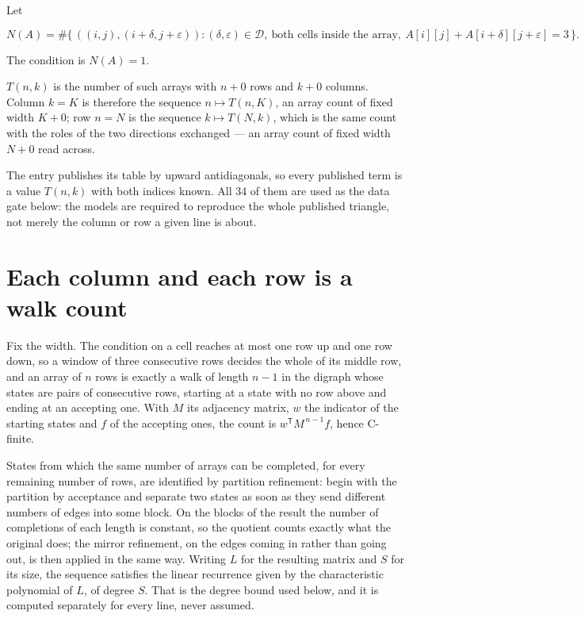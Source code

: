 \documentclass[11pt]{article}
\theoremstyle{definition}
\begin{document}
Let

\[N(A) = \#\bigl\{\,((i,j),(i{+}\delta,j{+}\varepsilon)) : (\delta,\varepsilon) \in \mathcal{D},\ \text{both cells inside the array},\ A[i][j] + A[i{+}\delta][j{+}\varepsilon] = 3\,\bigr\}.\]

The condition is $N(A) = 1$.

$T(n,k)$ is the number of such arrays with $n + 0$ rows and $k + 0$ columns. Column $k = K$ is therefore the sequence $n \mapsto T(n,K)$, an array count of fixed width $K + 0$; row $n = N$ is the sequence $k \mapsto T(N,k)$, which is the same count with the roles of the two directions exchanged --- an array count of fixed width $N + 0$ read across.

The entry publishes its table by upward antidiagonals, so every published term is a value $T(n,k)$ with both indices known. All 34 of them are used as the data gate below: the models are required to reproduce the whole published triangle, not merely the column or row a given line is about.

\section{Each column and each row is a walk count}

Fix the width. The condition on a cell reaches at most one row up and one row down, so a window of three consecutive rows decides the whole of its middle row, and an array of $n$ rows is exactly a walk of length $n-1$ in the digraph whose states are pairs of consecutive rows, starting at a state with no row above and ending at an accepting one. With $M$ its adjacency matrix, $w$ the indicator of the starting states and $f$ of the accepting ones, the count is $w^{\mathsf T}M^{\,n-1}f$, hence C-finite.

States from which the same number of arrays can be completed, for every remaining number of rows, are identified by partition refinement: begin with the partition by acceptance and separate two states as soon as they send different numbers of edges into some block. On the blocks of the result the number of completions of each length is constant, so the quotient counts exactly what the original does; the mirror refinement, on the edges coming in rather than going out, is then applied in the same way. Writing $L$ for the resulting matrix and $S$ for its size, the sequence satisfies the linear recurrence given by the characteristic polynomial of $L$, of degree $S$. That is the degree bound used below, and it is computed separately for every line, never assumed.
\end{document}
